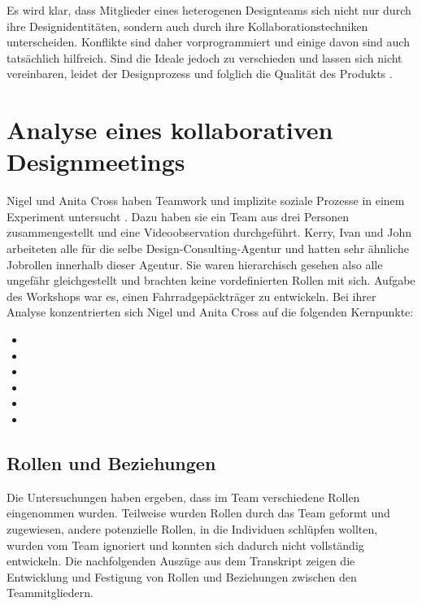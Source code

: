 \medskip Es wird klar, dass Mitglieder eines heterogenen Designteams sich nicht nur durch ihre Designidentitäten, sondern auch durch ihre Kollaborationstechniken unterscheiden. Konflikte sind daher vorprogrammiert und einige davon sind auch tatsächlich hilfreich. Sind die Ideale jedoch zu verschieden und lassen sich nicht vereinbaren, leidet der Designprozess und folglich die Qualität des Produkts \citep{Kilker:1999}. 

\section{Analyse eines kollaborativen Designmeetings} 

Nigel und Anita Cross haben Teamwork und implizite soziale Prozesse in einem Experiment untersucht \citep{Cross:1995}. Dazu haben sie ein Team aus drei Personen zusammengestellt und eine Videoobservation durchgeführt. Kerry, Ivan und John arbeiteten alle für die selbe Design-Consulting-Agentur und hatten sehr ähnliche Jobrollen innerhalb dieser Agentur. Sie waren hierarchisch gesehen also alle ungefähr gleichgestellt und brachten keine vordefinierten Rollen mit sich. Aufgabe des Workshops war es, einen Fahrradgepäckträger zu entwickeln. Bei ihrer Analyse konzentrierten sich Nigel und Anita Cross auf die folgenden Kernpunkte:

\clearpage

\begin{itemize}
	\item {}
	\item {}
	\item {}
	\item {}
	\item {}
	\item {}
\end{itemize}

\subsection{Rollen und Beziehungen}\label{sec:collabRoles} 

Die Untersuchungen haben ergeben, dass im Team verschiedene Rollen eingenommen wurden. Teilweise wurden Rollen durch das Team geformt und zugewiesen, andere potenzielle Rollen, in die Individuen schlüpfen wollten, wurden vom Team ignoriert und konnten sich dadurch nicht vollständig entwickeln. Die nachfolgenden Auszüge aus dem Transkript zeigen die Entwicklung und Festigung von Rollen und Beziehungen zwischen den Teammitgliedern.


